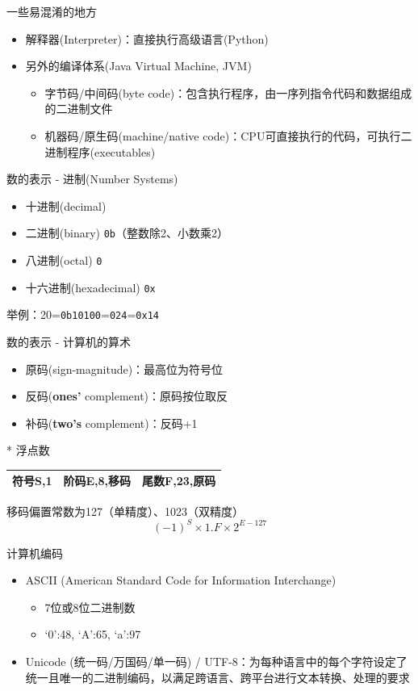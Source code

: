 \documentclass{myslide}
\begin{document}
\begin{frame}{一些易混淆的地方}
\begin{itemize}
	\item<1-> 解释器(Interpreter)：直接执行高级语言(Python)
	\item<2-> 另外的编译体系(Java Virtual Machine, JVM)
	\begin{itemize}
		\item 字节码/中间码(byte code)：包含执行程序，由一序列指令代码和数据组成的二进制文件
		\item 机器码/原生码(machine/native code)：CPU可直接执行的代码，可执行二进制程序(executables)
	\end{itemize}
\end{itemize}
\end{frame}

\begin{frame}[fragile]{数的表示 - 进制(Number Systems)}
\begin{itemize}
	\item 十进制(decimal)
	\item 二进制(binary) \verb'0b'（整数除2、小数乘2）
	\item 八进制(octal) \verb'0'
	\item 十六进制(hexadecimal) \verb'0x'
\end{itemize}
举例：20=\verb'0b10100'=\verb'024'=\verb'0x14'
\end{frame}

\begin{frame}{数的表示 - 计算机的算术}
\begin{itemize}
	\item 原码(sign-magnitude)：最高位为符号位
	\item 反码(\textbf{ones'} complement)：原码按位取反
	\item 补码(\textbf{two's} complement)：反码+1
\end{itemize}
\pause
* 浮点数
\begin{center}
\begin{tabular}{|c|c|c|}\hline
符号S,1 & 阶码E,8,移码 & 尾数F,23,原码
\\\hline
\end{tabular}
\end{center}
移码偏置常数为127（单精度）、1023（双精度）
\[(-1)^S\times1.F\times 2^{E-127}\]
\end{frame}

\begin{frame}{计算机编码}
\begin{itemize}
	\item ASCII (American Standard Code for Information Interchange)
	\begin{itemize}
		\item 7位或8位二进制数
		\item `0':48, `A':65, `a':97
	\end{itemize}
	\item Unicode (统一码/万国码/单一码) / UTF-8：为每种语言中的每个字符设定了统一且唯一的二进制编码，以满足跨语言、跨平台进行文本转换、处理的要求
\end{itemize}
\end{frame}
\end{document}

